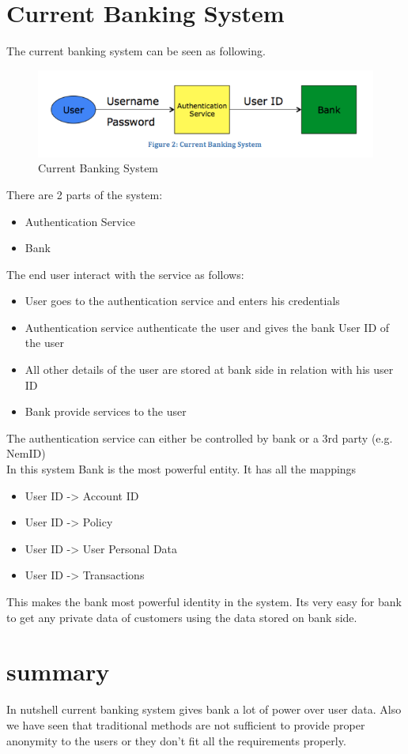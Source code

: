 \section{Current Banking System}
The current banking system can be seen as following.
\begin{figure}[h]
	\centering
	\includegraphics[width=\textwidth]{figures/Current}
	\caption{Current Banking System}
	\label{fig:Current}
\end{figure}
There are 2 parts of the system:
\begin{itemize}
	\item Authentication Service 
	\item Bank
\end{itemize}
The end user interact with the service as follows:
\begin{itemize}
\item User goes to the authentication service and enters his credentials
\item Authentication service authenticate the user and gives the bank User ID of the user
\item All other details of the user are stored at bank side in relation with his user ID
\item Bank provide services to the user 
\end{itemize}
The authentication service can either be controlled by bank or a 3rd party (e.g. NemID)
\\In this system Bank is the most powerful entity. It has all the mappings
\begin{itemize}
	\item User ID -> Account ID
	\item User ID -> Policy
	\item User ID -> User Personal Data
	\item User ID -> Transactions
\end{itemize}
This makes the bank most powerful identity in the system. Its very easy for bank to get any private data of customers using the data stored on bank side.
\section{summary}
In nutshell current banking system gives bank a lot of power over user data. Also we have seen that traditional methods are not sufficient to provide proper anonymity to the users or they don't fit all the requirements properly.